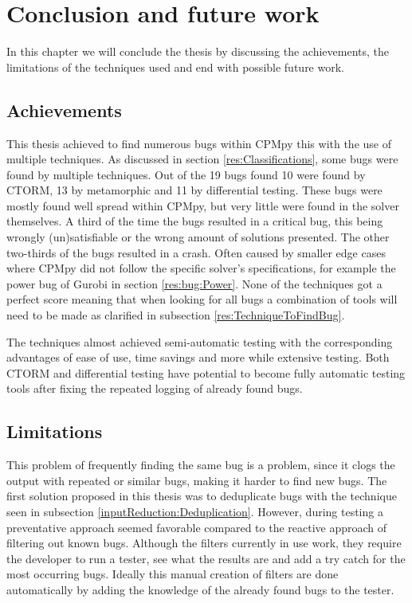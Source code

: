 \chapter{Conclusion and future work}
\label{cha:7:conclusion}
\label{con:intro}
In this chapter we will conclude the thesis by discussing the achievements, the limitations of the techniques used and end with possible future work.

\section{Achievements}
\label{con:Achievements}
This thesis achieved to find numerous bugs within CPMpy this with the use of multiple techniques. As discussed in section \ref{res:Classifications}, some bugs were found by multiple techniques. Out of the 19 bugs found 10 were found by CTORM, 13 by metamorphic and 11 by differential testing. These bugs were mostly found well spread within CPMpy, but very little were found in the solver themselves. A third of the time the bugs resulted in a critical bug, this being wrongly (un)satisfiable or the wrong amount of solutions presented. The other two-thirds of the bugs resulted in a crash. Often caused by smaller edge cases where CPMpy did not follow the specific solver’s specifications, for example the power bug of Gurobi in section \ref{res:bug:Power}. None of the techniques got a perfect score meaning that when looking for all bugs a combination of tools will need to be made as clarified in subsection \ref{res:TechniqueToFindBug}.

The techniques almost achieved semi-automatic testing with the corresponding advantages of ease of use, time savings and more while extensive testing. Both CTORM and differential testing have potential to become fully automatic testing tools after fixing the repeated logging of already found bugs.


\section{Limitations}
\label{con:Limitations}
This problem of frequently finding the same bug is a problem, since it clogs the output with repeated or similar bugs, making it harder to find new bugs. The first solution proposed in this thesis was to deduplicate bugs with the technique seen in subsection \ref{inputReduction:Deduplication}. However, during testing a preventative approach seemed  favorable compared to the reactive approach of filtering out known bugs. Although the filters currently in use work, they require the developer to run a tester, see what the results are and add a try catch for the most occurring bugs. Ideally this manual creation of filters are done automatically by adding the knowledge of the already found bugs to the tester. 


